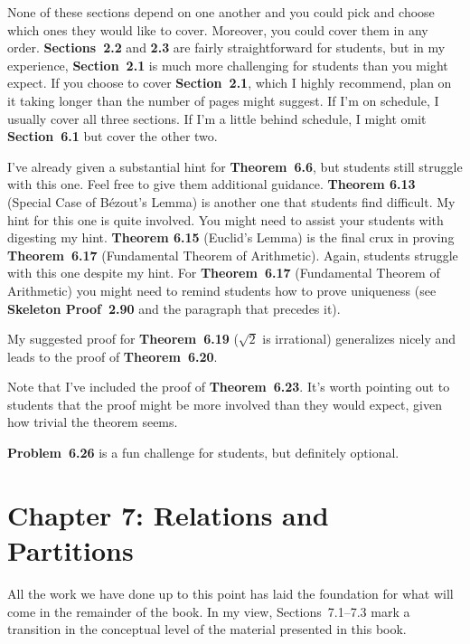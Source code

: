 \documentclass[11pt]{article}%
\newcommand{\blankline}{\pagebreak[2]\vspace{.5\baselineskip}}
\begin{document}
\blankline

None of these sections depend on one another and you could pick and choose which ones they would like to cover.  Moreover, you could cover them in any order.  \textbf{Sections~2.2} and \textbf{2.3} are fairly straightforward for students, but in my experience, \textbf{Section~2.1} is much more challenging for students than you might expect.  If you choose to cover  \textbf{Section~2.1}, which I highly recommend, plan on it taking longer than the number of pages might suggest.  If I'm on schedule, I usually cover all three sections.  If I'm a little behind schedule, I might omit \textbf{Section~6.1} but cover the other two.

\blankline

I've already given a substantial hint for \textbf{Theorem~6.6}, but students still struggle with this one.  Feel free to give them additional guidance.  \textbf{Theorem 6.13} (Special Case of B\'ezout's Lemma) is another one that students find difficult.  My hint for this one is quite involved.  You might need to assist your students with digesting my hint.  \textbf{Theorem 6.15} (Euclid's Lemma) is the final crux in proving \textbf{Theorem~6.17} (Fundamental Theorem of Arithmetic).  Again, students struggle with this one despite my hint.  For \textbf{Theorem~6.17} (Fundamental Theorem of Arithmetic) you might need to remind students how to prove uniqueness (see \textbf{Skeleton Proof~2.90} and the paragraph that precedes it).

\blankline

My suggested proof for \textbf{Theorem~6.19} ($\sqrt{2}$ is irrational) generalizes nicely and leads to the proof of \textbf{Theorem~6.20}.

\blankline

Note that I've included the proof of \textbf{Theorem~6.23}. It's worth pointing out to students that the proof might be more involved than they would expect, given how trivial the theorem seems.

\blankline

\textbf{Problem~6.26} is a fun challenge for students, but definitely optional. 


\section*{Chapter 7: Relations and Partitions}

All the work we have done up to this point has laid the foundation for what will come in the remainder of the book. In my view, Sections~7.1--7.3 mark a transition in the conceptual level of the material presented in this book.  
\end{document}
